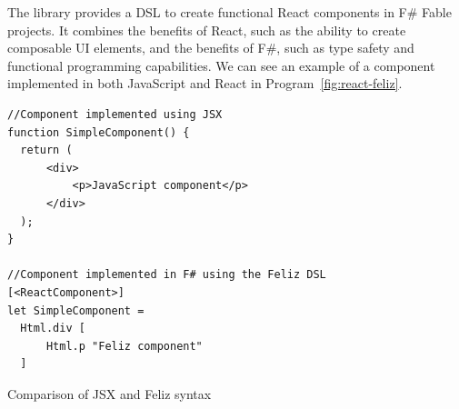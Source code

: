 The \citet{feliz} library provides a DSL to create functional React components in F\# Fable projects.
It combines the benefits of React, such as the ability to create composable UI elements, and the benefits of F\#, such as type safety and functional programming capabilities.
We can see an example of a component implemented in both JavaScript and React in Program~\ref{fig:react-feliz}.
\begin{listing}[htbp]
	\begin{center}
		\begin{lstlisting}
//Component implemented using JSX
function SimpleComponent() {
  return (
      <div>
          <p>JavaScript component</p>
      </div>
  );
} 

//Component implemented in F# using the Feliz DSL
[<ReactComponent>]
let SimpleComponent = 
  Html.div [
      Html.p "Feliz component"
  ]
  \end{lstlisting}
	\end{center}
	\caption{Comparison of JSX and Feliz syntax}
	\label{fig:react-feliz}
\end{listing}

